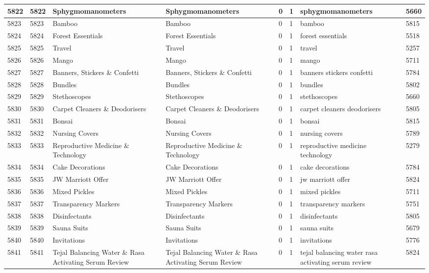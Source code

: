 \begin{longtable}{|l|l|l|l|l|l|l|l|}
5822 & 5822 & Sphygmomanometers & Sphygmomanometers & 0 & 1 & sphygmomanometers & 5660 \\ \hline 
5823 & 5823 & Bamboo & Bamboo & 0 & 1 & bamboo & 5815 \\ \hline 
5824 & 5824 & Forest Essentials & Forest Essentials & 0 & 1 & forest essentials & 5518 \\ \hline 
5825 & 5825 & Travel & Travel & 0 & 1 & travel & 5257 \\ \hline 
5826 & 5826 & Mango & Mango & 0 & 1 & mango & 5711 \\ \hline 
5827 & 5827 & Banners, Stickers \& Confetti & Banners, Stickers \& Confetti & 0 & 1 & banners stickers confetti & 5784 \\ \hline 
5828 & 5828 & Bundles & Bundles & 0 & 1 & bundles & 5802 \\ \hline 
5829 & 5829 & Stethoscopes & Stethoscopes & 0 & 1 & stethoscopes & 5660 \\ \hline 
5830 & 5830 & Carpet Cleaners \& Deodorisers & Carpet Cleaners \& Deodorisers & 0 & 1 & carpet cleaners deodorisers & 5805 \\ \hline 
5831 & 5831 & Bonsai & Bonsai & 0 & 1 & bonsai & 5815 \\ \hline 
5832 & 5832 & Nursing Covers & Nursing Covers & 0 & 1 & nursing covers & 5789 \\ \hline 
5833 & 5833 & Reproductive Medicine \& Technology & Reproductive Medicine \& Technology & 0 & 1 & reproductive medicine technology & 5279 \\ \hline 
5834 & 5834 & Cake Decorations & Cake Decorations & 0 & 1 & cake decorations & 5784 \\ \hline 
5835 & 5835 & JW Marriott Offer & JW Marriott Offer & 0 & 1 & jw marriott offer & 5824 \\ \hline 
5836 & 5836 & Mixed Pickles & Mixed Pickles & 0 & 1 & mixed pickles & 5711 \\ \hline 
5837 & 5837 & Transparency Markers & Transparency Markers & 0 & 1 & transparency markers & 5751 \\ \hline 
5838 & 5838 & Disinfectants & Disinfectants & 0 & 1 & disinfectants & 5805 \\ \hline 
5839 & 5839 & Sauna Suits & Sauna Suits & 0 & 1 & sauna suits & 5679 \\ \hline 
5840 & 5840 & Invitations & Invitations & 0 & 1 & invitations & 5776 \\ \hline 
5841 & 5841 & Tejal Balancing Water \&  Rasa Activating Serum Review & Tejal Balancing Water \&  Rasa Activating Serum Review & 0 & 1 & tejal balancing water rasa activating serum review & 5824 \\ \hline 

\end{longtable}
